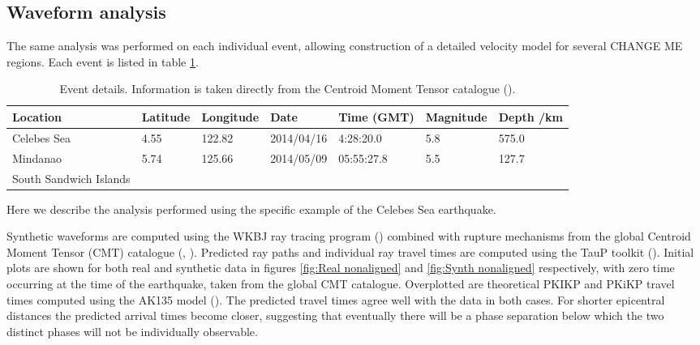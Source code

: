 \documentclass[11pt,a4paper]{article}
\begin{document}
\subsection{Waveform analysis}
\label{sec:Waveforms}
The same analysis was performed on each individual event, allowing construction of a detailed velocity model for several CHANGE ME regions. Each event is listed in table \ref{tab:Events}.
\begin{table}
\centering
\begin{tabular}{| l | l | l | l | l | l | l |}
	\hline Location				& Latitude	& Longitude	& Date		& Time (GMT)	& Magnitude	& Depth /km 	\\
	\hline Celebes Sea			& 4.55	& 122.82		& 2014/04/16	& 4:28:20.0	& 5.8			& 575.0  		\\ 
	\hline Mindanao			& 5.74	& 125.66		& 2014/05/09	& 05:55:27.8	& 5.5			& 127.7		\\
	\hline South Sandwich Islands 	&		& 			& 			& 			& 			&			\\\hline	
\end{tabular}
\caption{Event details. Information is taken directly from the Centroid Moment Tensor catalogue (\cite{Ekstrom2012}).}
\label{tab:Events}
\end{table}
Here we describe the analysis performed using the specific example of the Celebes Sea earthquake.

Synthetic waveforms are computed using the WKBJ ray tracing program (\cite{Chapman1976}) combined with rupture mechanisms from the global Centroid Moment Tensor (CMT) catalogue (\cite{Dziewonski1981}, \cite{Alboussiere2012}). Predicted ray paths and individual ray travel times are computed using the TauP toolkit (\cite{Crotwell1999}). Initial plots are shown for both real and synthetic data in figures \ref{fig:Real nonaligned} and \ref{fig:Synth nonaligned} respectively, with zero time occurring at the time of the earthquake, taken from the global CMT catalogue. Overplotted are theoretical PKIKP and PKiKP travel times computed using the AK135 model (\cite{Kennett1995b}). The predicted travel times agree well with the data in both cases.  For shorter epicentral distances the predicted arrival times become closer, suggesting that eventually there will be a phase separation below which the two distinct phases will not be individually observable.
\end{document}
